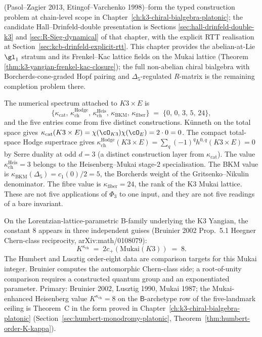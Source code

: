 \begin{remark}
(Pasol--Zagier 2013, Etingof--Varchenko 1998)--form the typed
construction problem at chain-level scope in
Chapter~\ref{ch:k3-chiral-bialgebra-platonic}; the candidate
Hall--Drinfeld-double presentation is Sections
\ref{sec:hall-drinfeld-double-k3} and
\ref{sec:R-Sieg-dynamical} of that chapter, with the explicit
RTT realisation at Section~\ref{sec:kcb-drinfeld-explicit-rtt}. This
chapter provides the abelian-at-Lie $\gl_1$ stratum and its
Frenkel--Kac lattice fields on the Mukai lattice (Theorem
\ref{thm:k3-yangian-frenkel-kac-closure}); the full non-abelian
chiral bialgebra with Borcherds-cone-graded Hopf pairing and
$\Delta_5$-regulated $R$-matrix is the remaining completion problem there.
\end{remark}

\begin{remark}
\label{rem:k3yang-k3e-four-kappa-values}
The numerical spectrum attached to $K3\times E$ is
\[
\{\kappa_{\mathrm{cat}},\,
  \kappa_{\mathrm{ch}}^{\mathrm{Hodge}},\,
  \kappa_{\mathrm{ch}}^{\mathrm{Heis}},\,
  \kappa_{\mathrm{BKM}},\,
  \kappa_{\mathrm{fiber}}\}
\;=\;
\{0,\,0,\,3,\,5,\,24\},
\]
and the five entries come from five distinct constructions.
K\"unneth on the total space gives
\(\kappa_{\mathrm{cat}}(K3\times E)
=\chi(\cO_{K3})\chi(\cO_E)=2\cdot0=0\). The compact total-space
Hodge supertrace gives \(\kappa_{\mathrm{ch}}^{\mathrm{Hodge}}(K3\times E)
= \sum_q(-1)^q h^{0,q}(K3\times E) = 0\) by Serre duality at odd
$d = 3$ (a distinct construction layer from $\kappa_{\mathrm{cat}}$).
The value \(\kappa_{\mathrm{ch}}^{\mathrm{Heis}}=3\) belongs to the
Heisenberg--Mukai stage-$2$ specialisation. The BKM value is
\(\kappa_{\mathrm{BKM}}(\Delta_5)=c_1(0)/2=5\), the Borcherds weight
of the Gritsenko--Nikulin denominator. The fibre value is
\(\kappa_{\mathrm{fiber}}=24\), the rank of the K3 Mukai lattice.
These are not five applications of $\Phi_3$ to one input, and they
are not five readings of a bare invariant.
\end{remark}

\begin{remark}
\label{rem:k3yang-summary-2}
On the Lorentzian-lattice-parametric B-family underlying the K3 Yangian,
the constant $8$ appears in three independent guises (Bruinier 2002
Prop.~5.1 Heegner Chern-class reciprocity, arXiv:math/0108079):
\[
K^{\kappa_{\mathrm{ch}}} \;=\; 2c_+(\mathrm{Mukai}(K3))
\;=\; 8.
\]
The Humbert and Lusztig order-eight data are comparison targets for
this Mukai integer. Bruinier computes the automorphic Chern-class
side; a root-of-unity comparison requires a constructed quantum group
and an exponentiated parameter. Primary: Bruinier 2002, Lusztig 1990, Mukai 1987; the
Mukai-enhanced Heisenberg value $K^{\kappa_{\mathrm{ch}}} = 8$ on the
$\mathsf{B}$-archetype row of the five-landmark ceiling is Theorem~C
in the form proved in Chapter~\ref{ch:k3-chiral-bialgebra-platonic}
(Section~\ref{sec:humbert-monodromy-platonic}, Theorem~\ref{thm:humbert-order-K-kappa}).
\end{remark}

